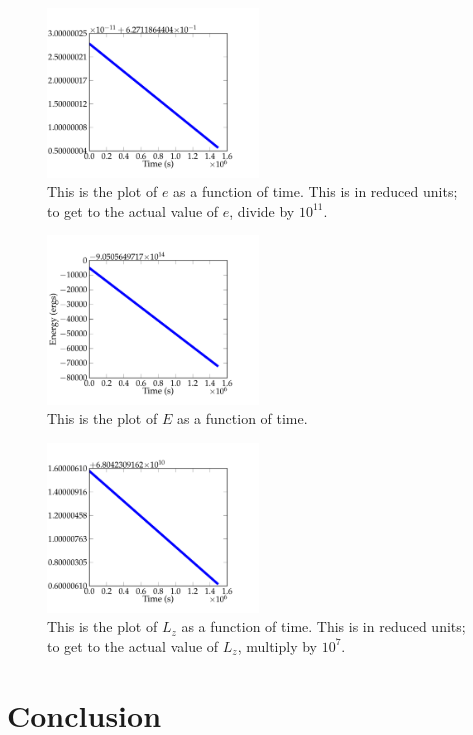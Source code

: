 \documentclass[11pt,letterpaper]{article}
\begin{document}
\begin{figure}[bth]
\centering
\includegraphics[width=0.5\textwidth]{output4_figs/eccentricity.pdf}
\caption{This is the plot of $e$ as a function of time. This is in reduced units; to get to the actual value of $e$, divide by $10^{11}$.}
\label{fig:simpleplot2}
\end{figure}

\begin{figure}[bth]
\centering
\includegraphics[width=0.5\textwidth]{output4_figs/energy.pdf}
\caption{This is the plot of $E$ as a function of time.}
\label{fig:simpleplot2}
\end{figure}

\begin{figure}[bth]
\centering
\includegraphics[width=0.5\textwidth]{output4_figs/angular_momentum.pdf}
\caption{This is the plot of $L_z$ as a function of time. This is in reduced units; to get to the actual value of $L_z$, multiply by $10^7$.}
\label{fig:simpleplot2}
\end{figure}

\section{Conclusion}
\end{document}
